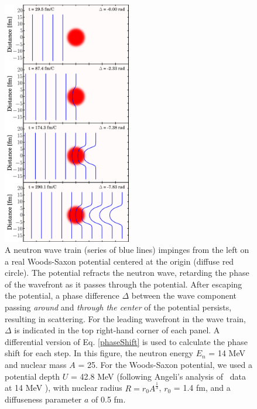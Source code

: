 \begin{figure}[ht!]
    \includegraphics[width=0.5\textwidth]{figures/phaseShiftStillsFigure.png}
    \caption[A illustration of the nuclear Ramsauer effect]{
        A neutron wave train (series of
        blue lines) impinges from the left on a real Woods-Saxon
        potential centered at the origin (diffuse red circle). The potential
        refracts the neutron wave,
        retarding the phase of the wavefront as it passes through the
        potential. After escaping the potential, a phase difference $\Delta$ between
        the wave component passing \textit{around} and \textit{through the center}
        of the potential persists, resulting in scattering.
        For the leading wavefront in the wave train, $\Delta$ is indicated in
        the top right-hand corner of each panel. A differential version of
        Eq. \ref{phaseShift} is used to
        calculate the phase shift for each step. In this figure, the neutron
        energy $E_{n}$ = 14 MeV and nuclear mass $A$ = 25. For the Woods-Saxon potential,
        we used a potential depth $U$ = 42.8 MeV (following Angeli's analysis
        of \tot\ data at 14 MeV \cite{Angeli1970}), with nuclear radius $R = 
        r_{0}A^{\frac{1}{3}}$, $r_{0}$ = 1.4 fm, and a diffuseness parameter
        $a$ of 0.5 fm.
    }
    \label{RamsauerPhaseShiftFigure}
\end{figure}

